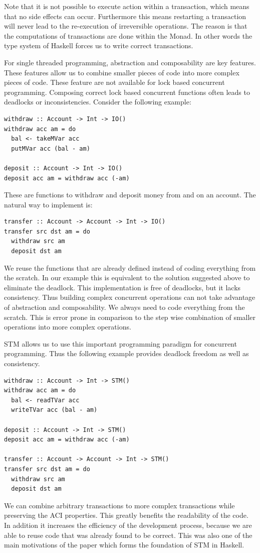Note that it is not possible to execute  action within a transaction, which means that no side effects can occur. Furthermore this means
restarting a transaction will never lead to the re-execution of irreversible operations. The reason is that the computations of transactions
are done within the  Monad. In other words the type system of Haskell forces us to write correct transactions. 
 
For single threaded programming, abstraction and composability are key features. These features allow us to combine smaller pieces
of code into more complex pieces of code. These feature are not available for lock based concurrent programming. Composing correct lock based
concurrent functions often leads to deadlocks or inconsistencies. Consider the following example:
\begin{lstlisting}
withdraw :: Account -> Int -> IO()
withdraw acc am = do 
  bal <- takeMVar acc 
  putMVar acc (bal - am)
 
deposit :: Account -> Int -> IO()
deposit acc am = withdraw acc (-am)
\end{lstlisting}
These are functions to withdraw and deposit money from and on an account. The natural way to implement  is:
\begin{lstlisting}
transfer :: Account -> Account -> Int -> IO()
transfer src dst am = do
  withdraw src am
  deposit dst am
\end{lstlisting}
We reuse the functions that are already defined instead of coding everything from the scratch. In our example this is equivalent 
to the solution suggested above to eliminate the deadlock. This implementation is free of deadlocks, but it lacks consistency.
Thus building complex concurrent operations can not take advantage of abstraction and composability. We always need to code
everything from the scratch. This is error prone in comparison to the step wise combination of smaller operations into 
more complex operations.

STM allows us to use this important programming paradigm for concurrent programming. Thus the following example provides
deadlock freedom as well as consistency.
\begin{lstlisting}
withdraw :: Account -> Int -> STM()
withdraw acc am = do 
  bal <- readTVar acc 
  writeTVar acc (bal - am)
 
deposit :: Account -> Int -> STM()
deposit acc am = withdraw acc (-am)

transfer :: Account -> Account -> Int -> STM()
transfer src dst am = do
  withdraw src am
  deposit dst am
\end{lstlisting}
We can combine arbitrary transactions to more complex transactions while preserving the ACI properties. This greatly benefits the 
readability of the code. In addition it increases the efficiency of the development process, because we are able to reuse code
that was already found to be correct. This was also one of the main motivations of the paper \parencite{STMBase} which forms the foundation
of STM in Haskell. 

